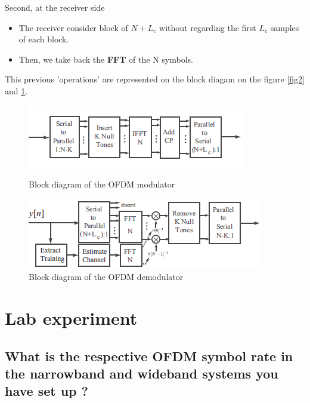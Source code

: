 \documentclass[frenchb, oneside, headings=normal]{scrartcl}
\begin{document}
Second, at the receiver side

\begin{itemize}

\item The receiver consider block of $N+L_c$ without regarding the first $L_c$ samples of each block.

\item Then, we take back the \textbf{FFT} of the N symbols.

\end{itemize}

This previous 'operations' are represented on the block diagam on the figure \ref{fig2} and \ref{fig3}.

\begin{figure}[!ht]
    \begin{minipage}[b]{0.48\linewidth}
        \centering \includegraphics[scale=0.9]{img/OFDDM_modulator.png}
     \caption{Block diagram of the OFDM modulator}
     \label{fig2}
    \end{minipage}\hfill
    \begin{minipage}[b]{0.48\linewidth}
         \centering \includegraphics[scale=0.9]{img/OFDDM_demodulator.png}
 \caption{Block diagram of the OFDM demodulator}\label{fig3}
    \end{minipage}
\end{figure}

\section{Lab experiment}

\subsection{What is the respective OFDM symbol rate in the narrowband and wideband systems you have set up ?}
\end{document}
